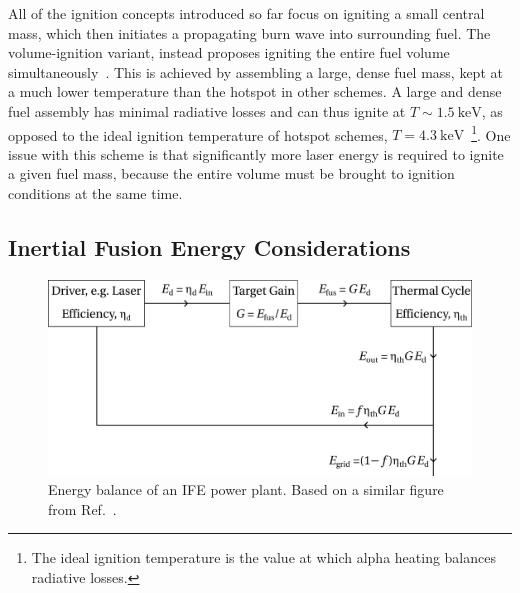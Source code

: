 All of the ignition concepts introduced so far focus on igniting a small central mass, which then initiates a propagating burn wave into surrounding fuel.
The volume-ignition variant, instead proposes igniting the entire fuel volume simultaneously~\cite{khoda-bakhsh_advanced_1992,molvig_low_2016}.
This is achieved by assembling a large, dense fuel mass, kept at a much lower temperature than the hotspot in other schemes.
A large and dense fuel assembly has minimal radiative losses and can thus ignite at $T\sim1.5\ \text{keV}$, as opposed to the ideal ignition temperature of hotspot schemes, $T=4.3\ \text{keV}$~\cite{atzeni_physics_2004}\footnote{The ideal ignition temperature is the value at which alpha heating balances radiative losses.}.
One issue with this scheme is that significantly more laser energy is required to ignite a given fuel mass, because the entire volume must be brought to ignition conditions at the same time.

\subsection{Inertial Fusion Energy Considerations}%
\label{sec:intro_IFE_gain}

\begin{figure}[t!]
    \includegraphics[width=0.8\linewidth]{Introduction/Images/IFE_powerplant.png}
    \centering
    \caption{Energy balance of an \ac{IFE} power plant.
    Based on a similar figure from Ref.~\cite{atzeni_physics_2004}.
    }%
    \label{fig:intro_IFE_energy_balance}
\end{figure}

